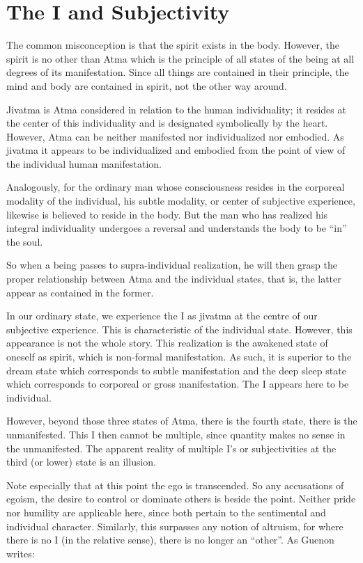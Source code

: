 \section{The I and Subjectivity}

The common misconception is that the spirit exists in the body. However, the spirit is no other than Atma which is the principle of all states of the being at all degrees of its manifestation. Since all things are contained in their principle, the mind and body are contained in spirit, not the other way around.

Jivatma is Atma considered in relation to the human individuality; it resides at the center of this individuality and is designated symbolically by the heart. However, Atma can be neither manifested nor individualized nor embodied. As jivatma it appears to be individualized and embodied from the point of view of the individual human manifestation.

Analogously, for the ordinary man whose consciousness resides in the corporeal modality of the individual, his subtle modality, or center of subjective experience, likewise is believed to reside in the body. But the man who has realized his integral individuality undergoes a reversal and understands the body to be ``in'' the soul.

So when a being passes to supra-individual realization, he will then grasp the proper relationship between Atma and the individual states, that is, the latter appear as contained in the former.

In our ordinary state, we experience the I as jivatma at the centre of our subjective experience. This is characteristic of the individual state. However, this appearance is not the whole story. This realization is the awakened state of oneself as spirit, which is non-formal manifestation. As such, it is superior to the dream state which corresponds to subtle manifestation and the deep sleep state which corresponds to corporeal or gross manifestation. The I appears here to be individual.

However, beyond those three states of Atma, there is the fourth state, there is the unmanifested. This I then cannot be multiple, since quantity makes no sense in the unmanifested. The apparent reality of multiple I's or subjectivities at the third (or lower) state is an illusion.

Note especially that at this point the ego is transcended. So any accusations of egoism, the desire to control or dominate others is beside the point. Neither pride nor humility are applicable here, since both pertain to the sentimental and individual character. Similarly, this surpasses any notion of altruism, for where there is no I (in the relative sense), there is no longer an ``other''. As Guenon writes:

